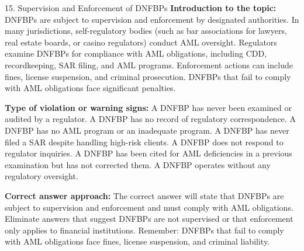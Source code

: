 \documentclass[11pt,a4paper]{beamer}
\begin{document}
\begin{frame}{15. Supervision and Enforcement of DNFBPs}
\tiny
\noindent\textbf{Introduction to the topic:} DNFBPs are subject to supervision and enforcement by designated authorities. In many jurisdictions, self-regulatory bodies (such as bar associations for lawyers, real estate boards, or casino regulators) conduct AML oversight. Regulators examine DNFBPs for compliance with AML obligations, including CDD, recordkeeping, SAR filing, and AML programs. Enforcement actions can include fines, license suspension, and criminal prosecution. DNFBPs that fail to comply with AML obligations face significant penalties.

\vspace{0.1cm}
\noindent\textbf{Type of violation or warning signs:} A DNFBP has never been examined or audited by a regulator. A DNFBP has no record of regulatory correspondence. A DNFBP has no AML program or an inadequate program. A DNFBP has never filed a SAR despite handling high-risk clients. A DNFBP does not respond to regulator inquiries. A DNFBP has been cited for AML deficiencies in a previous examination but has not corrected them. A DNFBP operates without any regulatory oversight.

\vspace{0.1cm}
\noindent\textbf{Correct answer approach:} The correct answer will state that DNFBPs are subject to supervision and enforcement and must comply with AML obligations. Eliminate answers that suggest DNFBPs are not supervised or that enforcement only applies to financial institutions. Remember: DNFBPs that fail to comply with AML obligations face fines, license suspension, and criminal liability.
\end{frame}
\end{document}
